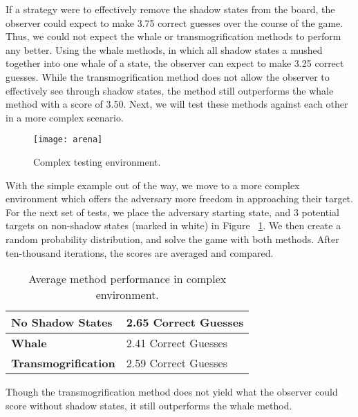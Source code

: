 If a strategy were to effectively remove the shadow states from the board, the observer could expect to make 3.75 correct guesses over the course of the game. Thus, we could not expect the whale or transmogrification methods to perform any better. Using the whale methods, in which all shadow states a mushed together into one whale of a state, the observer can expect to make 3.25 correct guesses. While the transmogrification method does not allow the observer to effectively see through shadow states, the method still outperforms the whale method with a score of 3.50. Next, we will test these methods against each other in a more complex scenario.  

\begin{figure}[h!]
\begin{center}

  \texttt{[image: arena]}
  \end{center}

  \caption{Complex testing environment.}
  
  \label{fig:arena}
\end{figure}

With the simple example out of the way, we move to a more complex environment which offers the adversary more freedom in approaching their target. For the next set of tests, we place the adversary starting state, and 3 potential targets on non-shadow states (marked in white) in Figure ~\ref{fig:arena}. We then create a random probability distribution, and solve the game with both methods. After ten-thousand iterations, the scores are averaged and compared. 

\begin{table}[hbtp]
\begin{center}
\begin{tabular}{|l|l|}
\hline 
\textbf{No Shadow States} & 2.65 Correct Guesses\\
\hline
\textbf{Whale} & 2.41 Correct Guesses\\
\hline
\textbf{Transmogrification} & 2.59 Correct Guesses\\
\hline
\end{tabular}
\end{center}
\caption{Average method performance in complex environment.}
\label{table:simpletable}
\end{table}

Though the transmogrification method does not yield what the observer could score without shadow states, it still outperforms the whale method.

\nocite{Dijkstra80}
\nocite{plop03-paper}
